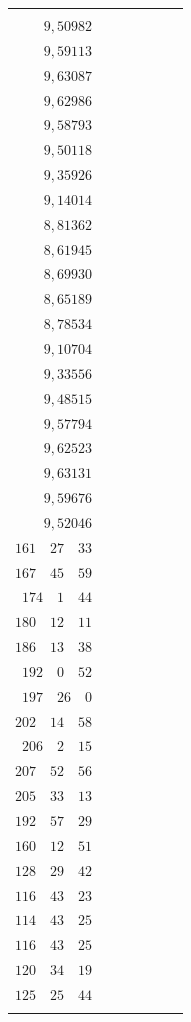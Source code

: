 \begin{landscape}
\begin{center}
\begin{tabular}{r|r|r|r|r|r|r}
{\(9{,}40021\) \\
\(9{,}50982\) \\[3pt]
\(9{,}59113\) \\
\(9{,}63087\) \\
\(9{,}62986\) \\
\(9{,}58793\) \\[3pt]
\(9{,}50118\) \\
\(9{,}35926\) \\
\(9{,}14014\) \\
\(8{,}81362\) \\[3pt]
\(8{,}61945\) \\
\(8{,}69930\) \\
\(8{,}65189\) \\
\(8{,}78534\) \\[3pt]
\(9{,}10704\) \\
\(9{,}33556\) \\
\(9{,}48515\) \\
\(9{,}57794\) \\[3pt]
\(9{,}62523\) \\
\(9{,}63131\) \\
\(9{,}59676\) \\
\(9{,}52046\)
}
&
\GaussVIIcolumn{
\(155^0\quad 9'\quad 18''\) \\
\(161\quad 27\quad 33\) \\
\(167\quad 45\quad 59\) \\
\(174\quad 1\quad 44\) \\[3pt]
\(180\quad 12\quad 11\) \\
\(186\quad 13\quad 38\) \\
\(192\quad 0\quad 52\) \\
\(197\quad 26\quad 0\) \\[3pt]
\(202\quad 14\quad 58\) \\
\(206\quad 2\quad 15\) \\
\(207\quad 52\quad 56\) \\
\(205\quad 33\quad 13\) \\[3pt]
\(192\quad 57\quad 29\) \\
\(160\quad 12\quad 51\) \\
\(128\quad 29\quad 42\) \\
\(116\quad 43\quad 23\) \\[3pt]
\(114\quad 43\quad 25\) \\
\(116\quad 43\quad 25\) \\
\(120\quad 34\quad 19\) \\
\(125\quad 25\quad 44\) \\[3pt]
}
\end{tabular}
\end{center}
\end{landscape}
